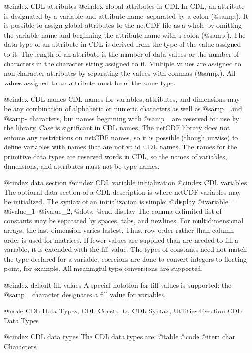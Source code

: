 {@cindex CDL attributes
@cindex global attributes in CDL
In CDL, an attribute is designated by a variable and attribute name,
separated by a colon (@samp{:}).  It is possible to assign global
attributes to the netCDF file as a
whole by omitting the variable name and beginning the attribute name
with a
colon (@samp{:}).  The data
type of an attribute in CDL is derived from the type of the value
assigned to it.  The length of an attribute is the number of data values
or the number of characters in the character string assigned to it.
Multiple values are assigned to non-character attributes by separating
the values with commas (@samp{,}).  All values assigned to an attribute
must be of the same type.

@cindex CDL names
CDL names for variables, attributes, and dimensions may be any
combination of alphabetic or numeric characters as well as @samp{_} and
@samp{-} characters, but names beginning with @samp{_} are reserved for
use by the library.  Case is significant in CDL names.  The netCDF
library does not enforce any restrictions on netCDF names, so it is
possible (though unwise) to define variables with names that are not
valid CDL names.  The names for the primitive data types are reserved
words in CDL, so the names of variables, dimensions, and attributes must
not be type names.

@cindex data section
@cindex CDL variable initialization
@cindex CDL variables
The optional data section of a CDL description is where
netCDF variables may be initialized.  The syntax of an initialization
is simple:
@display
        @i{variable} = @i{value_1}, @i{value_2}, @dots{};
@end display
The comma-delimited list of constants may be separated by spaces, tabs,
and newlines.  For multidimensional arrays, the last dimension varies
fastest.  Thus, row-order rather than column order is used for matrices.
If fewer values are supplied than are needed to fill a variable, it is
extended with the fill value.  The types of
constants need not match the type declared for a variable; coercions are
done to convert integers to floating point, for example.  All
meaningful type conversions are supported.

@cindex default fill values
A special notation for fill values is supported: the @samp{_}
character designates a fill value for variables.

@node CDL Data Types, CDL Constants, CDL Syntax, Utilities
@section CDL Data Types

@cindex CDL data types
The CDL data types are:
@table @code
@item char
Characters.

}
